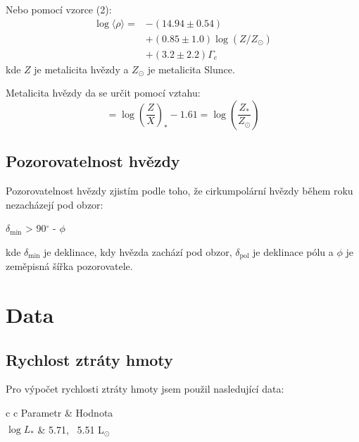 \documentclass[a4paper,11pt]{article}
\begin{document}
\newpage 
    \begin{minipage}[t]{0.5\textwidth} 
                Nebo pomocí vzorce (2):
                \begin{equation}
                    \begin{aligned}
                        \log \langle \rho \rangle = & - (14.94 \pm 0.54) \\
                        & + (0.85 \pm 1.0) \log (Z/Z_{\odot}) \\
                        & + (3.2 \pm 2.2) \Gamma_e
                    \end{aligned}
                \end{equation}
                kde $Z$ je metalicita hvězdy a $Z_{\odot}$ je metalicita Slunce.
                \par Metalicita hvězdy da se určit pomocí vztahu:
                \begin{equation}
                    [Fe/H] = \log \left(\frac{Z}{X}\right)_* - 1.61 = \log \left(\frac{Z_*}{Z_{\odot}}\right)
                \end{equation}

            \subsection{Pozorovatelnost hvězdy}
                Pozorovatelnost hvězdy zjistím podle toho, že cirkumpolární hvězdy během roku nezacházejí pod obzor: 
                \begin{center}
                    $\delta_{\text{min}}$ > 90$^{\circ}$ - $\phi$
                \end{center}
                kde $\delta_{\text{min}}$ je deklinace, kdy hvězda zachází pod obzor, $\delta_{\text{pol}}$ je deklinace pólu a $\phi$ je zeměpisná šířka pozorovatele.
        \section{Data}
            \subsection{Rychlost ztráty hmoty}
                Pro výpočet rychlosti ztráty hmoty jsem použil nasledující data:
                \begin{center}
                    \begin{tabular}{c c}
                        \hline
                        Parametr & Hodnota \\
                        \hline
                        $\log L_*$ & 5.71\textsuperscript{\cite{2004A&A...413..693M}},~ 5.51\textsuperscript{\cite{1987ApJS...64..545G}} L$_{\odot}$ \\
                        

\end{tabular}
\end{center}
\end{minipage}
\end{document}
